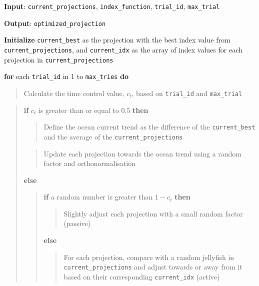 \documentclass[
  12pt,
]{interact}
\theoremstyle{plain}
\begin{document}
\begin{tcolorbox}[enhanced jigsaw, bottomtitle=1mm, breakable, colbacktitle=quarto-callout-note-color!10!white, opacitybacktitle=0.6, title={Algorithm: Jellyfish Optimizer Pseudo Code}, left=2mm, arc=.35mm, rightrule=.15mm, colframe=quarto-callout-note-color-frame, colback=white, leftrule=.75mm, bottomrule=.15mm, toptitle=1mm, toprule=.15mm, titlerule=0mm, opacityback=0, coltitle=black]

\textbf{Input}: \texttt{current\_projections}, \texttt{index\_function},
\texttt{trial\_id}, \texttt{max\_trial}

\textbf{Output}: \texttt{optimized\_projection}

\textbf{Initialize} \texttt{current\_best} as the projection with the
best index value from \texttt{current\_projections}, and
\texttt{current\_idx} as the array of index values for each projection
in \texttt{current\_projections}

\textbf{for} each \texttt{trial\_id} in 1 to \texttt{max\_tries}
\textbf{do}

\begin{quote}
Calculate the time control value, \(c_t\), based on \texttt{trial\_id}
and \texttt{max\_trial}
\end{quote}

\begin{quote}
\textbf{if} \(c_t\) is greater than or equal to \(0.5\) \textbf{then}

\begin{quote}
Define the ocean current trend as the difference of the
\texttt{current\_best} and the average of the
\texttt{current\_projections}
\end{quote}

\begin{quote}
Update each projection towards the ocean trend using a random factor and
orthonormalisation
\end{quote}

\textbf{else}

\begin{quote}
\textbf{if} a random number is greater than \(1 - c_t\) \textbf{then}

\begin{quote}
Slightly adjust each projection with a small random factor (passive)
\end{quote}

\textbf{else}

\begin{quote}
For each projection, compare with a random jellyfish in
\texttt{current\_projections} and adjust towards or away from it based
on their corresponding \texttt{current\_idx} (active)
\end{quote}
\end{quote}


\end{quote}
\end{tcolorbox}
\end{document}
